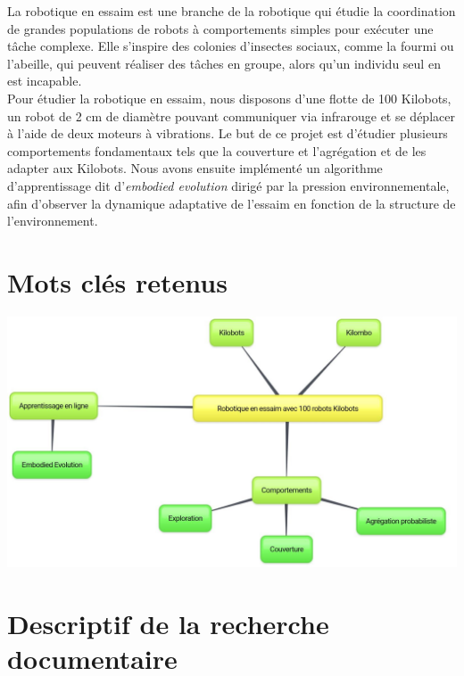 \documentclass[a4paper]{article}
\begin{document}
La robotique en essaim est une branche de la robotique qui étudie la coordination de grandes populations de robots à comportements simples pour exécuter une tâche complexe. Elle s'inspire des colonies d'insectes sociaux, comme la fourmi ou l'abeille, qui peuvent réaliser des tâches en groupe, alors qu'un individu seul en est incapable. \\ Pour étudier la robotique en essaim, nous disposons d'une flotte de 100 Kilobots, un robot de 2 cm de diamètre pouvant communiquer via infrarouge et se déplacer à l'aide de deux moteurs à vibrations. Le but de ce projet est d'étudier plusieurs comportements fondamentaux tels que la couverture et l'agrégation et de les adapter aux Kilobots. Nous avons ensuite implémenté un algorithme d'apprentissage dit d'\textit{embodied evolution} dirigé par la pression environnementale, afin d'observer la dynamique adaptative de l'essaim en fonction de la structure de l'environnement.

\section{Mots clés retenus}

\includegraphics[width=15cm]{incl/carte_heuristique.jpg}

\section{Descriptif de la recherche documentaire}
\end{document}
